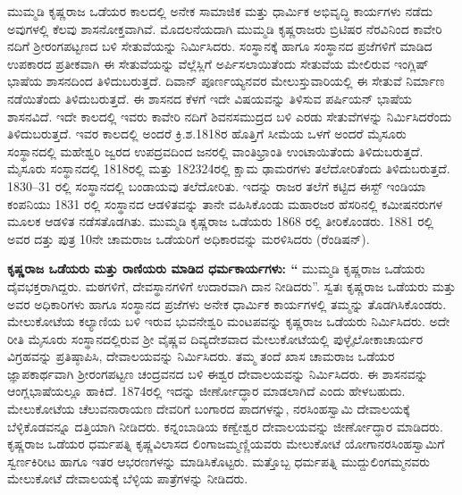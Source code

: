 ಮುಮ್ಮಡಿ ಕೃಷ್ಣರಾಜ ಒಡೆಯರ ಕಾಲದಲ್ಲಿ ಅನೇಕ ಸಾಮಾಜಿಕ ಮತ್ತು ಧಾರ್ಮಿಕ ಅಭಿವೃದ್ಧಿ ಕಾರ್ಯಗಳು ನಡೆದು ಅವುಗಳಲ್ಲಿ ಕೆಲವು ಶಾಸನೋಕ್ತವಾಗಿವೆ. ಮೊದಲನೆಯದಾಗಿ ಮುಮ್ಮಡಿ ಕೃಷ್ಣರಾಜರು ಬ್ರಿಟಿಷರ ನೆರವಿನಿಂದ ಕಾವೇರಿ ನದಿಗೆ ಶ‍್ರೀರಂಗಪಟ್ಟಣದ ಬಳಿ ಸೇತುವೆಯನ್ನು ನಿರ್ಮಿಸಿದರು. ಸಂಸ್ಥಾನಕ್ಕೆ ಹಾಗೂ ಸಂಸ್ಥಾನದ ಪ್ರಜೆಗಳಿಗೆ ಮಾಡಿದ ಉಪಕಾರದ ಪ್ರತೀಕವಾಗಿ ಈ ಸೇತುವೆಯನ್ನು ವೆಲ್ಲೆಸ್ಲಿಗೆ ಅರ್ಪಿಸಲಾಯಿತೆಂದು ಸೇತುವೆಯ ಮೇಲಿರುವ ಇಂಗ್ಲಿಷ್​ ಭಾಷೆಯ ಶಾಸನದಿಂದ ತಿಳಿದುಬರುತ್ತದೆ. ದಿವಾನ್​ ಪೂರ್ಣಯ್ಯನವರ ಮೇಲುಸ್ತುವಾರಿಯಲ್ಲಿ ಈ ಸೇತುವೆ ನಿರ್ಮಾಣ ನಡೆಯಿತೆಂದು ತಿಳಿದು\-ಬರುತ್ತದೆ. ಈ ಶಾಸನದ ಕೆಳಗೆ ಇದೇ ವಿಷಯವನ್ನು ತಿಳಿಸುವ ಪರ್ಷಿಯನ್​ ಭಾಷೆಯ ಶಾಸನವಿದೆ. ಇದೇ ಕಾಲದಲ್ಲಿ ಇವರು ಕಾವೇರಿ ನದಿಗೆ ಶಿವನಸಮುದ್ರದ ಬಳಿ ಎರಡು ಸೇತುವೆಗಳನ್ನು ನಿರ್ಮಿಸಿದರೆಂದು ತಿಳಿದುಬರುತ್ತದೆ. ಇವರ ಕಾಲದಲ್ಲಿ ಅಂದರೆ ಕ್ರಿ.ಶ.1818ರ ಹೊತ್ತಿಗೆ ಸೀಮೆಯ ಒಳಗೆ ಅಂದರೆ ಮೈಸೂರು ಸಂಸ್ಥಾನದಲ್ಲಿ ಮಹೇಶ್ವರಿ ಜ್ವರದ ಉಪದ್ರವದಿಂದ ಜನರಲ್ಲಿ ವಾಂತಿಭ್ರಾಂತಿ ಉಂಟಾಯಿತೆಂದು ತಿಳಿದುಬರುತ್ತದೆ. ಮೈಸೂರು ಸಂಸ್ಥಾನದಲ್ಲಿ 1818ರಲ್ಲಿ ಮತ್ತು 182324ರಲ್ಲಿ ಕ್ಷಾಮ ಢಾಮರಗಳು ತಲೆದೋರಿತೆಂದು ತಿಳಿದುಬರುತ್ತದೆ. 1830–31 ರಲ್ಲಿ ಸಂಸ್ಥಾನದಲ್ಲಿ ಬಂಡಾಯವು ತಲೆದೋರಿತು. ಇದನ್ನು ರಾಜರ ತಲೆಗೆ ಕಟ್ಟಿದ ಈಸ್ಟ್ ಇಂಡಿಯಾ ಕಂಪನಿಯು 1831 ರಲ್ಲಿ ಸಂಸ್ಥಾನದ ಆಡಳಿತವನ್ನು ತಾನೇ ವಹಿಸಿಕೊಂಡು ಮಹಾರಜರ ಹೆಸರಿನಲ್ಲಿ ಕಮೀಷನರುಗಳ ಮೂಲಕ ಆಡಳಿತ ನಡೆಸತೊಡಗಿತು. ಮುಮ್ಮಡಿ ಕೃಷ್ಣರಾಜ ಒಡೆಯರು 1868 ರಲ್ಲಿ ತೀರಿಕೊಂಡರು. 1881 ರಲ್ಲಿ ಅವರ ದತ್ತು ಪುತ್ರ 10ನೇ ಚಾಮರಾಜ ಒಡೆಯರಿಗೆ ಅಧಿಕಾರವನ್ನು ಮರಳಿಸಿದರು (ರೆಂಡಿಷನ್).

\textbf{ ಕೃಷ್ಣರಾಜ ಒಡೆಯರು ಮತ್ತು ರಾಣಿಯರು ಮಾಡಿದ ಧರ್ಮಕಾರ್ಯಗಳು: “} ಮುಮ್ಮಡಿ ಕೃಷ್ಣರಾಜ ಒಡೆಯರು ದೈವಭಕ್ತರಾಗಿದ್ದರು. ಮಠಗಳಿಗೆ, ದೇವಸ್ಥಾನಗಳಿಗೆ ಉದಾರವಾಗಿ ದಾನ ನೀಡಿದರು”. ಸ್ವತಃ ಕೃಷ್ಣರಾಜ ಒಡೆಯರು ಮತ್ತು ಅವರ ಅಧಿಕಾರಿಗಳು ಹಾಗೂ ಸಂಸ್ಥಾನದ ಪ್ರಜೆಗಳು ಅನೇಕ ಧಾರ್ಮಿಕ ಕಾರ್ಯಗಳಲ್ಲಿ ತಮ್ಮನ್ನು ತೊಡಗಿಸಿಕೊಂಡರು. ಮೇಲುಕೋಟೆಯ ಕಲ್ಯಾಣಿಯ ಬಳಿ ಇರುವ ಭುವನೇಶ್ವರಿ ಮಂಟಪವನ್ನು ಕೃಷ್ಣರಾಜ ಒಡೆಯರು ನಿರ್ಮಿಸಿದರು. ಅದೇ ರೀತಿ ಮೈಸೂರು ಸಂಸ್ಥಾನದಲ್ಲಿರುವ ಶ‍್ರೀ ವೈಷ್ಣವ ದಿವ್ಯದೇಶವಾದ ಮೇಲುಕೋಟೆಯಲ್ಲಿ ಪುಳ್ಳೈಲೋಕಾಚಾರ್ಯರ ವಿಗ್ರಹವನ್ನು ಪ್ರತಿಷ್ಠಾಪಿಸಿ, ದೇವಾಲಯವನ್ನು ನಿರ್ಮಿಸಿದರು. ತಮ್ಮ ತಂದೆ ಖಾಸ ಚಾಮರಾಜ ಒಡೆಯರ ಜ್ಞಾಪಕಾರ್ಥ\-ವಾಗಿ ಶ‍್ರೀರಂಗಪಟ್ಟಣ ಚಂದ್ರವನದ ಬಳಿ ಈಶ್ವರ ದೇವಾಲಯವನ್ನು ನಿರ್ಮಿಸಿದರು. ಈ ಶಾಸನವನ್ನು ಆಂಗ್ಲಭಾಷೆ\-ಯಲ್ಲೂ ಹಾಕಿದೆ. 1874ರಲ್ಲಿ ಇದನ್ನು ಜೀರ್ಣೋದ್ಧಾರ ಮಾಡಲಾಗಿದೆ ಎಂದು ಹೇಳಬಹುದು. ಮೇಲುಕೋಟೆಯ ಚೆಲುವನಾರಾಯಣ ದೇವರಿಗೆ ಬಂಗಾರದ ಪಾದಗಳನ್ನು, ನರಸಿಂಹಸ್ವಾಮಿ ದೇವಾಲಯಕ್ಕೆ ಬೆಳ್ಳಿಕೊಡವನ್ನೂ ದತ್ತಿಯಾಗಿ ನೀಡಿದರು. ಕನ್ನಂಬಾಡಿಯ ಕಣ್ವೇಶ್ವರ ದೇವಾಲಯವನ್ನು ಜೀರ್ಣೋದ್ಧಾರ ಮಾಡಿದರು. ಕೃಷ್ಣರಾಜ ಒಡೆಯರ ಧರ್ಮಪತ್ನಿ ಕೃಷ್ಣವಿಲಾಸದ ಲಿಂಗಾಜಮ್ಮಣ್ಣಿಯವರು ಮೇಲುಕೋಟೆ ಯೋಗಾನರಸಿಂಹಸ್ವಾಮಿಗೆ ಸ್ವರ್ಣಕಿರೀಟ ಹಾಗೂ ಇತರ ಆಭರಣಗಳನ್ನು ಮಾಡಿಸಿಕೊಟ್ಟರು. ಮತ್ತೊಬ್ಬ ಧರ್ಮಪತ್ನಿ ಮುದ್ದುಲಿಂಗಮ್ಮನವರು ಮೇಲುಕೋಟೆ ದೇವಾಲಯಕ್ಕೆ ಬೆಳ್ಳಿಯ ಪಾತ್ರೆಗಳನ್ನು ನೀಡಿದರು.

